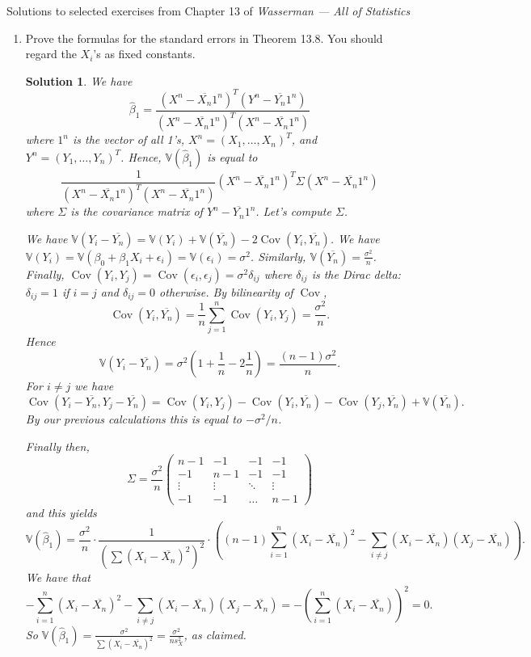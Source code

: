 \documentclass[10pt]{article}
\newtheorem*{sol}{Solution}
\newcommand{\V}{\mathbb{V}}
\newcommand{\Cov}{\operatorname{Cov}}
\begin{document}
\noindent \large{Solutions to selected exercises from Chapter 13 of
\emph{Wasserman --- All of Statistics}}

\begin{enumerate}

\item[(2)] Prove the formulas for the standard errors in Theorem 13.8. You should
regard the $X_i$'s as fixed constants.

\begin{sol}
We have
\[
\hat \beta_1 = \frac{(X^n - \overline{X_n}1^n)^T
(Y^n - \overline{Y_n}1^n)}{(X^n - \overline{X_n}1^n)^T
(X^n - \overline{X_n}1^n)}
\]
where $1^n$ is the vector of all 1's, $X^n=(X_1,\ldots,X_n)^T$,
and $Y^n=(Y_1,\ldots,Y_n)^T$. Hence, $\V(\hat \beta_1)$ is equal to
\[
\frac{1}{(X^n - \overline{X_n}1^n)^T
(X^n - \overline{X_n}1^n)}
(X^n - \overline{X_n}1^n)^T \Sigma (X^n - \overline{X_n}1^n)
\]
where $\Sigma$ is the covariance matrix of $Y^n - \overline{Y_n} 1^n$.
Let's compute $\Sigma$.

We have $\V(Y_i - \overline{Y_n})=
\V(Y_i) + \V(\overline{Y_n}) - 2\Cov(Y_i,\overline{Y_n})$.
We have $\V(Y_i)=\V(\beta_0+\beta_1X_i+\epsilon_i)=\V(\epsilon_i)=\sigma^2$.
Similarly, $\V(\overline{Y_n})=\frac{\sigma^2}{n}$. Finally,
$\Cov(Y_i,Y_j)=\Cov(\epsilon_i,\epsilon_j)=\sigma^2 \delta_{ij}$
where $\delta_{ij}$ is the Dirac delta: $\delta_{ij}=1$ if $i=j$ and
$\delta_{ij}=0$ otherwise.
By bilinearity of $\Cov$,
\[
\Cov(Y_i,\overline{Y_n}) = \frac{1}{n} \sum_{j=1}^n \Cov(Y_i,Y_j)=\frac{\sigma^2}{n}.
\]
Hence
\[
\V(Y_i-\overline{Y_n}) = \sigma^2\left(1+\frac{1}{n} - 2\frac{1}{n}\right) =
\frac{(n-1)\sigma^2}{n}.
\]
For $i\neq j$ we have
\[
\Cov(Y_i - \overline{Y_n}, Y_j - \overline{Y_n}) =
\Cov(Y_i, Y_j) - \Cov(Y_i, \overline{Y_n}) - \Cov(Y_j, \overline{Y_n}) +
\V(\overline{Y_n}).
\]
By our previous calculations this is equal to $-\sigma^2/n$.

Finally then,
\[
\Sigma = \frac{\sigma^2}{n}\begin{pmatrix}
n-1 & -1 & -1 & -1 \\
-1 & n-1 & -1 & -1 \\
\vdots & \vdots  & \ddots & \vdots \\
-1 & -1 & \ldots & n-1
\end{pmatrix}
\]
and this yields
\[
\V(\hat \beta_1) = \frac{\sigma^2}{n} \cdot
\frac{1}{\left(\sum (X_i - \overline{X_n})^2\right)^2} \cdot
\left((n-1)\sum_{i=1}^n (X_i - \overline{X_n})^2 - \sum_{i\neq j}
(X_i-\overline{X_n})(X_j-\overline{X_n})\right).
\]
We have that
\[
-\sum_{i=1}^n (X_i - \overline{X_n})^2 -
\sum_{i\neq j}(X_i-\overline{X_n})(X_j-\overline{X_n}) =
- \left(\sum_{i=1}^n (X_i-\overline{X_n})\right)^2 = 0.
\]
So
$\V(\hat \beta_1)=\frac{\sigma^2}{\sum (X_i-\overline{X_n})^2}=\frac{\sigma^2}{ns_X^2}$,
as claimed.


\end{sol}
\end{enumerate}
\end{document}
